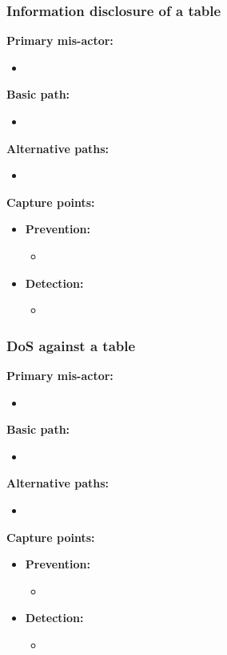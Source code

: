 \documentclass[a4paper,11pt]{report}
\begin{document}
\subsubsection{Information disclosure of a table}
\textbf{Primary mis-actor:}
\begin{itemize}
\item 
\end{itemize}
\textbf{Basic path:}
\begin{itemize}
\item 
\end{itemize}
\textbf{Alternative paths:}
\begin{itemize}
\item 
\end{itemize}
\textbf{Capture points:}
\begin{itemize}
\item \textbf{Prevention:}
\begin{itemize}
\item 
\end{itemize}
\item \textbf{Detection:}
\begin{itemize}
\item 
\end{itemize}
\end{itemize}
\subsubsection{DoS against a table}
\textbf{Primary mis-actor:}
\begin{itemize}
\item 
\end{itemize}
\textbf{Basic path:}
\begin{itemize}
\item 
\end{itemize}
\textbf{Alternative paths:}
\begin{itemize}
\item 
\end{itemize}
\textbf{Capture points:}
\begin{itemize}
\item \textbf{Prevention:}
\begin{itemize}
\item 
\end{itemize}
\item \textbf{Detection:}
\begin{itemize}
\item 
\end{itemize}
\end{itemize}
\end{document}
